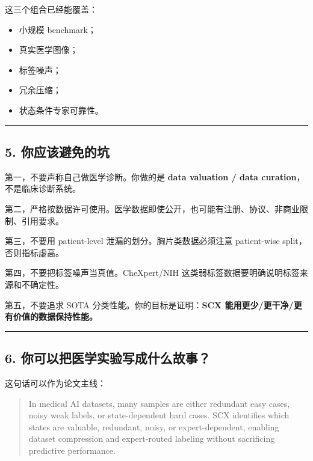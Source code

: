 \documentclass[
  12pt,
]{ctexart}
\providecommand{\tightlist}{%
  \setlength{\itemsep}{0pt}\setlength{\parskip}{0pt}}
\begin{document}
这三个组合已经能覆盖：

\begin{itemize}
\tightlist
\item
  小规模 benchmark；
\item
  真实医学图像；
\item
  标签噪声；
\item
  冗余压缩；
\item
  状态条件专家可靠性。
\end{itemize}

\begin{center}\rule{0.5\linewidth}{0.5pt}\end{center}

\subsection{5.
你应该避免的坑}\label{ux4f60ux5e94ux8be5ux907fux514dux7684ux5751}

第一，不要声称自己做医学诊断。你做的是 \textbf{data valuation / data
curation}，不是临床诊断系统。

第二，严格按数据许可使用。医学数据即使公开，也可能有注册、协议、非商业限制、引用要求。

第三，不要用 patient-level 泄漏的划分。胸片类数据必须注意 patient-wise
split，否则指标虚高。

第四，不要把标签噪声当真值。CheXpert/NIH
这类弱标签数据要明确说明标签来源和不确定性。

第五，不要追求 SOTA 分类性能。你的目标是证明：\textbf{SCX
能用更少/更干净/更有价值的数据保持性能。}

\begin{center}\rule{0.5\linewidth}{0.5pt}\end{center}

\subsection{6.
你可以把医学实验写成什么故事？}\label{ux4f60ux53efux4ee5ux628aux533bux5b66ux5b9eux9a8cux5199ux6210ux4ec0ux4e48ux6545ux4e8b}

这句话可以作为论文主线：

\begin{quote}
In medical AI datasets, many samples are either redundant easy cases,
noisy weak labels, or state-dependent hard cases. SCX identifies which
states are valuable, redundant, noisy, or expert-dependent, enabling
dataset compression and expert-routed labeling without sacrificing
predictive performance.
\end{quote}
\end{document}
